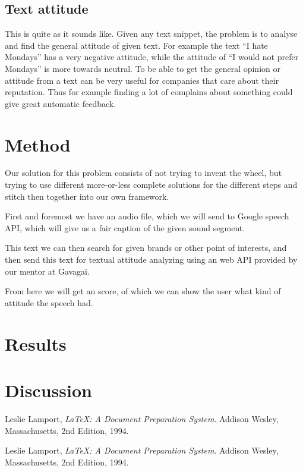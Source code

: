 \documentclass[a4paper,11pt,twoside]{ltxdoc}
\begin{document}
\subsection{Text attitude}
This is quite as it sounds like. Given any text snippet, the problem is to analyse and find the general attitude of given text. For example the text ``I hate Mondays'' has a very negative attitude, while the attitude of ``I would not prefer Mondays'' is more towards neutral.
To be able to get the general opinion or attitude from a text can be very useful for companies that care about their reputation. Thus for example finding a lot of complains about something could give great automatic feedback.


\section{Method}
Our solution for this problem consists of not trying to invent the wheel, but trying to use different more-or-less complete solutions for the different steps and stitch then together into our own framework.

First and foremost we have an audio file, which we will send to Google speech API, which will give us a fair caption of the given sound segment.

This text we can then search for given brands or other point of interests, and then send this text for textual attitude analyzing using an web API provided by our mentor at Gavagai.

From here we will get an score, of which we can show the user what kind of attitude the speech had. 

\section{Results}


\section{Discussion}


\newpage
\begin{thebibliography}{9}

  Leslie Lamport,
  \emph{\LaTeX: A Document Preparation System}.
  Addison Wesley, Massachusetts,
  2nd Edition,
  1994.

  Leslie Lamport,
  \emph{\LaTeX: A Document Preparation System}.
  Addison Wesley, Massachusetts,
  2nd Edition,
  1994.


\end{thebibliography}
\end{document}

